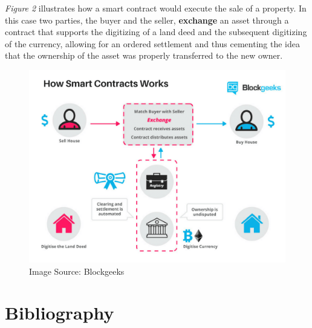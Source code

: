 \documentclass[submission,copyright,creativecommons]{eptcs}
\begin{document}
\textit{Figure 2} illustrates how a smart contract would execute the sale of a property.  In this case two parties, the buyer and the seller, \textbf{exchange} an asset through a contract that supports the digitizing of a land deed and the subsequent digitizing of the currency, allowing for an ordered settlement and thus cementing the idea that the ownership of the asset was properly transferred to the new owner\cite{WhatAreSmart}.
\begin{figure}[h]
    \centering
    \label{fig:howsmartcontractsworks}
    \includegraphics[width=5in]{How-Smart-Contracts-Works-1.png}
     \caption{Image Source: Blockgeeks}
\end{figure}

\newpage
\section{Bibliography}






\end{document}
